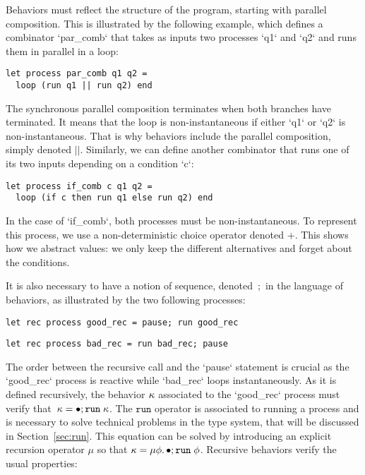 \documentclass[9pt]{sigplanconf}
\begin{document}
Behaviors must reflect the structure of the program, starting with parallel composition. This is illustrated by the following example, which defines a combinator `par_comb` that takes as inputs two processes `q1` and `q2` and runs them in parallel in a loop: 
\begin{lstlisting}
let process par_comb q1 q2 =
  loop (run q1 || run q2) end
\end{lstlisting}
The synchronous parallel composition terminates when both bran\-ches have terminated. It means that the loop is non-instantaneous if either `q1` or `q2` is non-instantaneous.  That is why behaviors include the parallel composition, simply denoted $||$.
%
Similarly, we can define another combinator that runs one of its two inputs depending on a condition `c`:
\begin{lstlisting}
let process if_comb c q1 q2 =
  loop (if c then run q1 else run q2) end
\end{lstlisting}
In the case of `if_comb`, both processes must be non-instantaneous. To represent this process, we use a non-deterministic choice operator denoted $+$. This shows how  we abstract values: we only keep the different alternatives and forget about the conditions.

It is also necessary to have a notion of sequence, denoted~$;$ in the language of behaviors, as illustrated by the two following processes: 
\begin{lstlisting}
let rec process good_rec = pause; run good_rec
\end{lstlisting}
\vspace{-0.5em}
\begin{lstlisting}
let rec process bad_rec = run bad_rec; pause
\end{lstlisting}
The order between the recursive call and the `pause` statement is crucial as the `good_rec` process is reactive while `bad_rec` loops instantaneously.
%
As it is defined recursively, the behavior  $\kappa$  associated to the `good_rec` process must verify that~\mbox{$ \kappa = \bullet ; \mathtt{run}\; \kappa$}. The $\mathtt{run}$ operator is associated to running a process and is necessary to solve technical problems in the type system, that will be discussed in Section~\ref{sec:run}. This equation can be solved by introducing an explicit recursion operator $\mu$ so that $\kappa = \mu \phi.\, \bullet ; \mathtt{run}\; \phi$. Recursive behaviors verify the usual properties:
\end{document}
